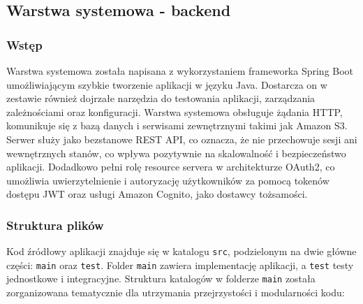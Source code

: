 \documentclass[../../main.tex]{subfiles}
\begin{document}
    \subsection{Warstwa systemowa - backend}

    \subsubsection{Wstęp}
    Warstwa systemowa została napisana z wykorzystaniem frameworka Spring Boot umożliwiającym szybkie tworzenie aplikacji w języku Java.
    Dostarcza on w zestawie również dojrzałe narzędzia do testowania aplikacji, zarządzania zależnościami oraz konfiguracji.
    Warstwa systemowa obsługuje żądania HTTP, komunikuje się z bazą danych i serwisami zewnętrznymi takimi jak Amazon S3.
    Serwer służy jako bezstanowe REST API, co oznacza, że nie przechowuje sesji ani wewnętrznych stanów, co wpływa pozytywnie na skalowalność i bezpieczeństwo aplikacji.
    Dodadkowo pełni rolę resource servera w architekturze OAuth2, co umożliwia uwierzytelnienie i autoryzację użytkowników za pomocą tokenów dostępu JWT oraz usługi Amazon Cognito, jako dostawcy tożsamości.

    \subsubsection{Struktura plików}
    Kod źródłowy aplikacji znajduje się w katalogu \texttt{src}, podzielonym na dwie główne części: \texttt{main} oraz \texttt{test}.
    Folder \texttt{main} zawiera implementację aplikacji, a \texttt{test} testy jednostkowe i integracyjne.
    Struktura katalogów w folderze \texttt{main} została zorganizowana tematycznie dla utrzymania przejrzystości i modularności kodu:
\end{document}
